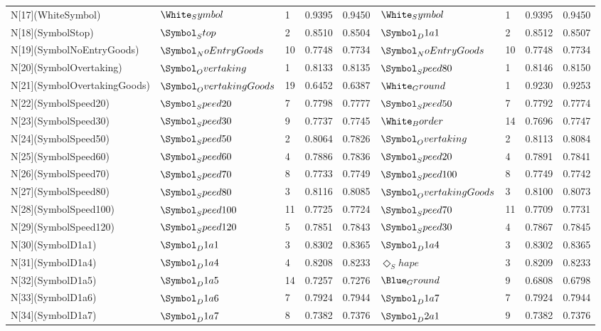 \begin{tabular}{lllllllll}
N[17](WhiteSymbol) & $\White_Symbol$ & 1 & 0.9395 & 0.9450 & $\White_Symbol$ & 1 & 0.9395 & 0.9450 \\
N[18](SymbolStop) & $\Symbol_Stop$ & 2 & 0.8510 & 0.8504 & $\Symbol_D1a1$ & 2 & 0.8512 & 0.8507 \\
N[19](SymbolNoEntryGoods) & $\Symbol_NoEntryGoods$ & 10 & 0.7748 & 0.7734 & $\Symbol_NoEntryGoods$ & 10 & 0.7748 & 0.7734 \\
N[20](SymbolOvertaking) & $\Symbol_Overtaking$ & 1 & 0.8133 & 0.8135 & $\Symbol_Speed80$ & 1 & 0.8146 & 0.8150 \\
N[21](SymbolOvertakingGoods) & $\Symbol_OvertakingGoods$ & 19 & 0.6452 & 0.6387 & $\White_Ground$ & 1 & 0.9230 & 0.9253 \\
N[22](SymbolSpeed20) & $\Symbol_Speed20$ & 7 & 0.7798 & 0.7777 & $\Symbol_Speed50$ & 7 & 0.7792 & 0.7774 \\
N[23](SymbolSpeed30) & $\Symbol_Speed30$ & 9 & 0.7737 & 0.7745 & $\White_Border$ & 14 & 0.7696 & 0.7747 \\
N[24](SymbolSpeed50) & $\Symbol_Speed50$ & 2 & 0.8064 & 0.7826 & $\Symbol_Overtaking$ & 2 & 0.8113 & 0.8084 \\
N[25](SymbolSpeed60) & $\Symbol_Speed60$ & 4 & 0.7886 & 0.7836 & $\Symbol_Speed20$ & 4 & 0.7891 & 0.7841 \\
N[26](SymbolSpeed70) & $\Symbol_Speed70$ & 8 & 0.7733 & 0.7749 & $\Symbol_Speed100$ & 8 & 0.7749 & 0.7742 \\
N[27](SymbolSpeed80) & $\Symbol_Speed80$ & 3 & 0.8116 & 0.8085 & $\Symbol_OvertakingGoods$ & 3 & 0.8100 & 0.8073 \\
N[28](SymbolSpeed100) & $\Symbol_Speed100$ & 11 & 0.7725 & 0.7724 & $\Symbol_Speed70$ & 11 & 0.7709 & 0.7731 \\
N[29](SymbolSpeed120) & $\Symbol_Speed120$ & 5 & 0.7851 & 0.7843 & $\Symbol_Speed30$ & 4 & 0.7867 & 0.7845 \\
N[30](SymbolD1a1) & $\Symbol_D1a1$ & 3 & 0.8302 & 0.8365 & $\Symbol_D1a4$ & 3 & 0.8302 & 0.8365 \\
N[31](SymbolD1a4) & $\Symbol_D1a4$ & 4 & 0.8208 & 0.8233 & $\Diamond_Shape$ & 3 & 0.8209 & 0.8233 \\
N[32](SymbolD1a5) & $\Symbol_D1a5$ & 14 & 0.7257 & 0.7276 & $\Blue_Ground$ & 9 & 0.6808 & 0.6798 \\
N[33](SymbolD1a6) & $\Symbol_D1a6$ & 7 & 0.7924 & 0.7944 & $\Symbol_D1a7$ & 7 & 0.7924 & 0.7944 \\
N[34](SymbolD1a7) & $\Symbol_D1a7$ & 8 & 0.7382 & 0.7376 & $\Symbol_D2a1$ & 9 & 0.7382 & 0.7376 \\

\end{tabular}
